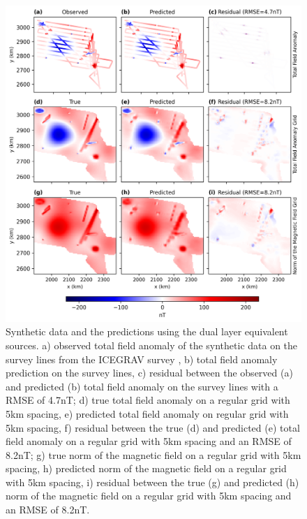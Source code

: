 \begin{figure}[!h]
\centering
\includegraphics[width=1\linewidth]{figures/dual_layer_synthetic.png}
\caption{
    Synthetic data and the predictions using the dual layer equivalent sources. a) observed total field anomaly of the synthetic data on the survey lines from the ICEGRAV survey \citep{ICEGRAV_data}, b) total field anomaly prediction on the survey lines, c) residual between the observed (a) and predicted (b) total field anomaly on the survey lines with a RMSE of 4.7nT; d) true total field anomaly on a regular grid with 5km spacing, e) predicted total field anomaly on regular grid with 5km spacing, f) residual between the true (d) and predicted (e) total field anomaly on a regular grid with 5km spacing and an RMSE of 8.2nT; g) true norm of the magnetic field on a regular grid with 5km spacing, h) predicted norm of the magnetic field on a regular grid with 5km spacing, i) residual between the true (g) and predicted (h) norm of the magnetic field on a regular grid with 5km spacing and an RMSE of 8.2nT.
}
\label{fig:dual_layer_synthetic}
\end{figure}
\

